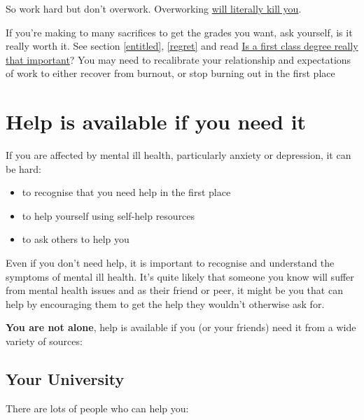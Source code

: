 \documentclass[
]{book}
\providecommand{\tightlist}{%
  \setlength{\itemsep}{0pt}\setlength{\parskip}{0pt}}
\begin{document}
So work hard but don't overwork. Overworking \href{https://www.bbc.com/worklife/article/20210518-how-overwork-is-literally-killing-us}{will literally kill you}. \citep{overworking}

If you're making to many sacrifices to get the grades you want, ask yourself, is it really worth it. See section \ref{entitled}, \ref{regret} and read \href{https://www.ft.com/content/8a2ee9b4-bd0f-11e9-b350-db00d509634e}{Is a first class degree really that important}? You may need to recalibrate your relationship and expectations of work to either recover from burnout, or stop burning out in the first place \citep{happyburnout}

\hypertarget{notalone}{%
\section{Help is available if you need it}\label{notalone}}

If you are affected by mental ill health, particularly anxiety or depression, it can be hard:

\begin{itemize}
\tightlist
\item
  to recognise that you need help in the first place
\item
  to help yourself using self-help resources
\item
  to ask others to help you
\end{itemize}

Even if you don't need help, it is important to recognise and understand the symptoms of mental ill health. It's quite likely that someone you know will suffer from mental health issues and as their friend or peer, it might be you that can help by encouraging them to get the help they wouldn't otherwise ask for.

\textbf{You are not alone}, help is available if you (or your friends) need it from a wide variety of sources:

\hypertarget{unihelp}{%
\subsection{Your University}\label{unihelp}}

There are lots of people who can help you:
\end{document}
